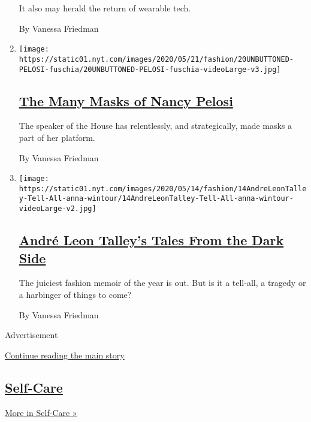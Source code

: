 \begin{enumerate}
  It also may herald the return of wearable tech.

  By Vanessa Friedman
\item
  \texttt{[image: https://static01.nyt.com/images/2020/05/21/fashion/20UNBUTTONED-PELOSI-fuschia/20UNBUTTONED-PELOSI-fuschia-videoLarge-v3.jpg]}

  \hypertarget{the-many-masks-of-nancy-pelosi}{%
  \subsection{\texorpdfstring{\href{/2020/05/20/fashion/nancy-pelosi-face-masks.html}{The
  Many Masks of Nancy
  Pelosi}}{The Many Masks of Nancy Pelosi}}\label{the-many-masks-of-nancy-pelosi}}

  The speaker of the House has relentlessly, and strategically, made
  masks a part of her platform.

  By Vanessa Friedman
\item
  \texttt{[image: https://static01.nyt.com/images/2020/05/14/fashion/14AndreLeonTalley-Tell-All-anna-wintour/14AndreLeonTalley-Tell-All-anna-wintour-videoLarge-v2.jpg]}

  \hypertarget{andruxe9-leon-talleys-tales-from-the-dark-side}{%
  \subsection{\texorpdfstring{\href{/2020/05/14/style/andre-leon-talley-anna-wintour-tell-all.html}{André
  Leon Talley's Tales From the Dark
  Side}}{André Leon Talley's Tales From the Dark Side}}\label{andruxe9-leon-talleys-tales-from-the-dark-side}}

  The juiciest fashion memoir of the year is out. But is it a tell-all,
  a tragedy or a harbinger of things to come?

  By Vanessa Friedman
\end{enumerate}

Advertisement

\protect\hyperlink{after-mid2}{Continue reading the main story}

\hypertarget{self-care}{%
\subsection{\texorpdfstring{\href{/section/style/self-care}{Self-Care}}{Self-Care}}\label{self-care}}

\href{/section/style/self-care}{More in Self-Care »}

